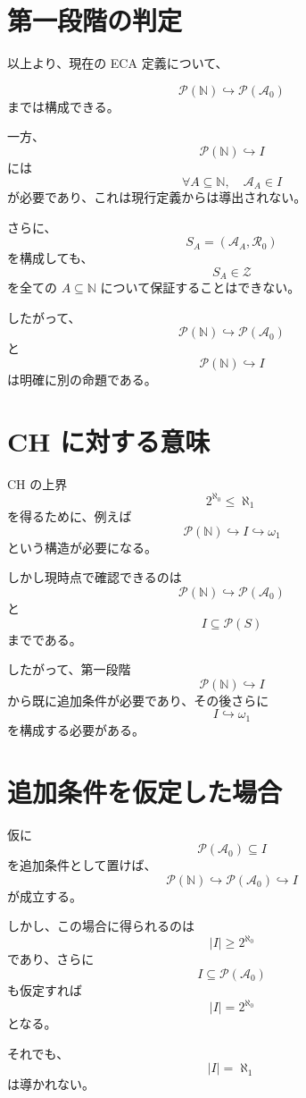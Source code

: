 \documentclass[a4paper,11pt]{article}
\begin{document}
\section{第一段階の判定}

以上より、現在の ECA 定義について、

\[
\boxed{
\mathcal{P}(\mathbb{N})
\hookrightarrow
\mathcal{P}(\mathcal{A}_0)
}
\]
までは構成できる。

一方、
\[
\boxed{
\mathcal{P}(\mathbb{N})
\hookrightarrow I
}
\]
には
\[
\forall A\subseteq\mathbb{N},\quad
\mathcal{A}_A\in I
\]
が必要であり、これは現行定義からは導出されない。

さらに、
\[
S_A=(\mathcal{A}_A,\mathcal{R}_0)
\]
を構成しても、
\[
S_A\in\mathcal{Z}
\]
を全ての $A\subseteq\mathbb{N}$ について保証することはできない。

したがって、
\[
\boxed{
\mathcal{P}(\mathbb{N})
\hookrightarrow
\mathcal{P}(\mathcal{A}_0)
}
\]
と
\[
\boxed{
\mathcal{P}(\mathbb{N})
\hookrightarrow
I
}
\]
は明確に別の命題である。

\section{CH に対する意味}

CH の上界
\[
2^{\aleph_0}\leq\aleph_1
\]
を得るために、例えば
\[
\mathcal{P}(\mathbb{N})
\hookrightarrow I
\hookrightarrow\omega_1
\]
という構造が必要になる。

しかし現時点で確認できるのは
\[
\mathcal{P}(\mathbb{N})
\hookrightarrow
\mathcal{P}(\mathcal{A}_0)
\]
と
\[
I\subseteq\mathcal{P}(S)
\]
までである。

したがって、第一段階
\[
\mathcal{P}(\mathbb{N})\hookrightarrow I
\]
から既に追加条件が必要であり、その後さらに
\[
I\hookrightarrow\omega_1
\]
を構成する必要がある。

\section{追加条件を仮定した場合}

仮に
\[
\boxed{
\mathcal{P}(\mathcal{A}_0)\subseteq I
}
\]
を追加条件として置けば、
\[
\mathcal{P}(\mathbb{N})
\hookrightarrow
\mathcal{P}(\mathcal{A}_0)
\hookrightarrow I
\]
が成立する。

しかし、この場合に得られるのは
\[
|I|\geq2^{\aleph_0}
\]
であり、さらに
\[
I\subseteq\mathcal{P}(\mathcal{A}_0)
\]
も仮定すれば
\[
|I|=2^{\aleph_0}
\]
となる。

それでも、
\[
|I|=\aleph_1
\]
は導かれない。
\end{document}
